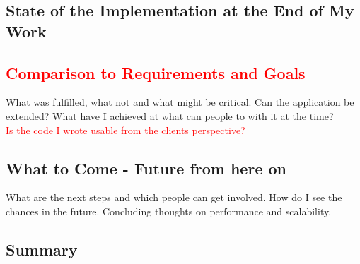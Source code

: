 \documentclass[12p]{scrartcl}
\begin{document}
\subsection{State of the Implementation at the End of My Work}
\subsection{\textcolor{red}{Comparison to Requirements and Goals}}
What was fulfilled, what not and what might be critical. Can the application be extended? What have I achieved at what can people to with it at the time?\\
\textcolor{red}{Is the code I wrote usable from the clients perspective?}
\subsection{What to Come - Future from here on}
What are the next steps and which people can get involved. How do I see the chances in the future. Concluding thoughts on performance and scalability.
\subsection{Summary}
\end{document}
